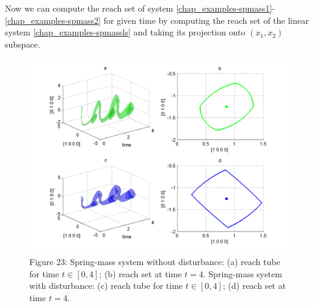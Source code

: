 \documentclass[letterpaper,10pt,english]{sphinxmanual}
\begin{document}
Now we can compute the reach set of system \eqref{chap_examples-spmass1}-\eqref{chap_examples-spmass2} for
given time by computing the reach set of the linear system \eqref{chap_examples-spmassls}
and taking its projection onto \((x_1, x_2)\) subspace.
\begin{figure}[htbp]
\centering
\capstart

\includegraphics[width=0.700\linewidth]{chapter06_section02_reachmech.png}
\caption{Figure 23: Spring-mass system without disturbance:
(a) reach tube for time \(t\in[0,4]\); (b) reach set at time \(t=4\).
Spring-mass system with disturbance:
(c) reach tube for time \(t\in[0,4]\); (d) reach set at time \(t=4\).}\label{chap_examples:mechreachfig}\end{figure}
\end{document}
